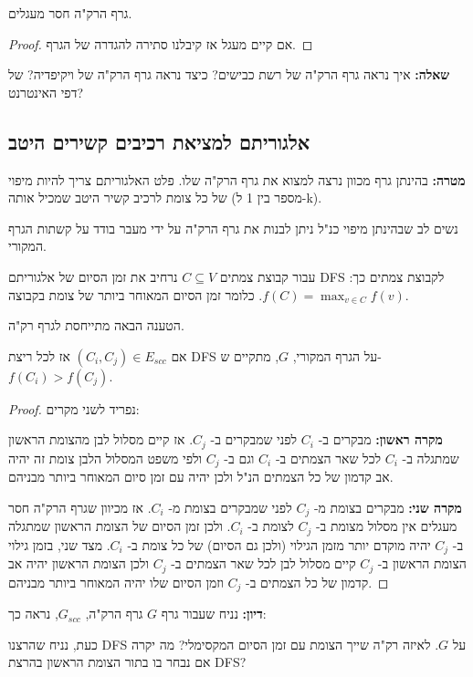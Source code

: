 \begin{observation}
גרף הרק"ה חסר מעגלים.
\end{observation}
\begin{proof}
אם קיים מעגל אז קיבלנו סתירה להגדרה של הגרף.

\end{proof}

\textbf{שאלה:}
איך נראה גרף הרק"ה של רשת כבישים? כיצד נראה גרף הרק"ה של ויקיפדיה? של דפי האינטרנט?

\subsection*{אלגוריתם למציאת רכיבים קשירים היטב}
\textbf{מטרה:}
בהינתן גרף מכוון נרצה למצוא את גרף הרק"ה שלו.
פלט האלגוריתם צריך להיות מיפוי של כל צומת לרכיב קשיר היטב שמכיל אותה (מספר בין 1 ל-k).

נשים לב שבהינתן מיפוי כנ"ל ניתן לבנות את גרף הרק"ה על ידי מעבר בודד על קשתות הגרף המקורי.



עבור קבוצת צמתים
$C \subseteq V$
נרחיב את זמן הסיום של אלגוריתם
\textenglish{DFS}
לקבוצת צמתים כך:
$f(C) = \max_{v \in C}f(v)$.
כלומר זמן הסיום המאוחר ביותר של צומת בקבוצה.


הטענה הבאה מתייחסת לגרף רק"ה.
\begin{claim}
אם
$(C_i,C_j) \in E_{scc}$
אז לכל ריצת 
\textenglish{DFS}
על הגרף המקורי, $G$, מתקיים ש-%
$f(C_i) > f(C_j)$.
\end{claim}

\begin{proof}
נפריד לשני מקרים:

\textbf{מקרה ראשון:}
מבקרים ב-%
$C_i$
לפני שמבקרים ב-%
$C_j$.
אז קיים מסלול לבן מהצומת הראשון שמתגלה ב-%
$C_i$
לכל שאר הצמתים ב-%
$C_i$
וגם ב-%
$C_j$
ולפי משפט המסלול הלבן צומת זה יהיה אב קדמון של כל הצמתים הנ"ל ולכן יהיה עם זמן סיום המאוחר 
ביותר מבניהם.

\textbf{מקרה שני:}
מבקרים בצומת מ-%
$C_j$
לפני שמבקרים בצומת מ-%
$C_i$.
אז מכיוון שגרף הרק"ה חסר מעגלים אין מסלול מצומת ב-%
$C_j$
לצומת ב-%
$C_i$.
ולכן זמן הסיום של הצומת הראשון שמתגלה ב-%
$C_j$
יהיה מוקדם יותר מזמן הגילוי (ולכן גם הסיום) של כל צומת ב-%
$C_i$.
מצד שני, בזמן גילוי הצומת הראשון ב-%
$C_j$
קיים מסלול לבן לכל שאר הצמתים ב-%
$C_j$
ולכן הצומת הראשון יהיה אב קדמון של כל הצמתים ב-%
$C_j$
וזמן הסיום שלו יהיה המאוחר ביותר מבניהם.
\end{proof}

\textbf{דיון:}
נניח שעבור גרף $G$ גרף הרק"ה,
$G_{scc}$,
נראה כך:
\begin{center}
\end{center}
כעת, נניח שהרצנו
\textenglish{DFS}
על $G$.
לאיזה רק"ה שייך הצומת עם זמן הסיום המקסימלי? 
מה יקרה אם נבחר בו בתור הצומת הראשון בהרצת
\textenglish{DFS}?


